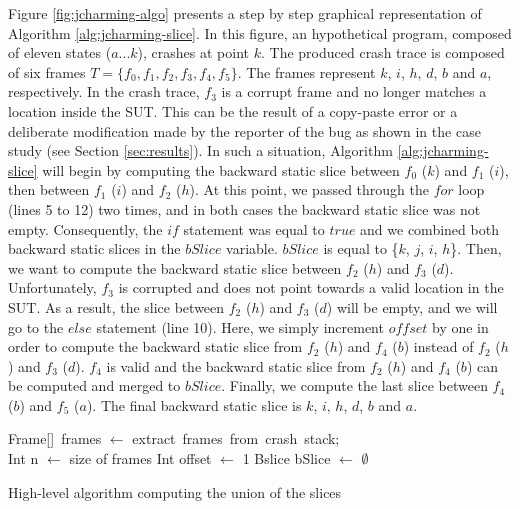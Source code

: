 \documentclass[12pt]{report}
\begin{document}
Figure \ref{fig:jcharming-algo} presents a step by step graphical
representation of Algorithm \ref{alg:jcharming-slice}. In this figure,
an hypothetical program, composed of eleven states (\(a...k\)), crashes
at point \(k\). The produced crash trace is composed of six frames
\(T=\{f_0, f_1, f_2, f_3, f_4, f_5\}\). The frames represent \(k\),
\(i\), \(h\), \(d\), \(b\) and \(a\), respectively. In the crash trace,
\(f_3\) is a corrupt frame and no longer matches a location inside the
SUT. This can be the result of a copy-paste error or a deliberate
modification made by the reporter of the bug as shown in the case study
(see Section \ref{sec:results}). In such a situation, Algorithm
\ref{alg:jcharming-slice} will begin by computing the backward static
slice between \(f_0\) (\(k\)) and \(f_1\) (\(i\)), then between \(f_1\)
(\(i\)) and \(f_2\) (\(h\)). At this point, we passed through the
\(for\) loop (lines 5 to 12) two times, and in both cases the backward
static slice was not empty. Consequently, the \(if\) statement was equal
to \(true\) and we combined both backward static slices in the
\(bSlice\) variable. \(bSlice\) is equal to \{\(k\), \(j\), \(i\),
\(h\)\}. Then, we want to compute the backward static slice between
\(f_2\) (\(h\)) and \(f_3\) (\(d\)). Unfortunately, \(f_3\) is corrupted
and does not point towards a valid location in the SUT. As a result, the
slice between \(f_2\) (\(h\)) and \(f_3\) (\(d\)) will be empty, and we
will go to the \(else\) statement (line 10). Here, we simply increment
\(offset\) by one in order to compute the backward static slice from
\(f_2\) (\(h\)) and \(f_4\) (\(b\)) instead of \(f_2\) (\(h\)) and
\(f_3\) (\(d\)). \(f_4\) is valid and the backward static slice from
\(f_2\) (\(h\)) and \(f_4\) (\(b\)) can be computed and merged to
\(bSlice\). Finally, we compute the last slice between \(f_4\) (\(b\))
and \(f_5\) (\(a\)). The final backward static slice is \(k\), \(i\),
\(h\), \(d\), \(b\) and \(a\).

\begin{algorithm}
 Frame[]~frames $\leftarrow$ extract~frames~from~crash~stack; \\
 Int n $\leftarrow$ size of frames\;
 Int offset $\leftarrow$ 1\;
 Bslice bSlice $\leftarrow$ $\emptyset$\;
\caption{High-level algorithm computing the union of the slices\label{alg:jcharming-slice}}
\end{algorithm}
\end{document}
